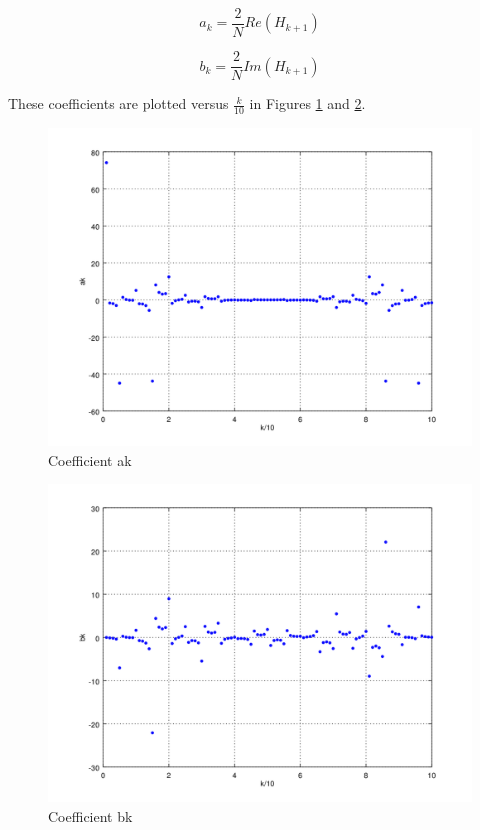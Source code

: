 \documentclass[12pt]{amsart}
\begin{document}
 \begin{equation}
 a_k = \frac{2}{N} Re(H_{k+1})
 \label{eq:ak}
 \end{equation}
 
 \begin{equation}
 b_k = \frac{2}{N} Im(H_{k+1})
 \label{eq:ak}
 \end{equation}

These coefficients are plotted versus $\frac{k}{10}$ in Figures \ref{fig:akplot} and \ref{fig:bkplot}.

\begin{center}
\begin{figure}
\includegraphics[scale=0.7]{akplot}
\caption{Coefficient ak}
\label{fig:akplot}
\end{figure}
\end{center}

\begin{center}
\begin{figure}
\includegraphics[scale=0.7]{bkplot}
\caption{Coefficient bk}
\label{fig:bkplot}
\end{figure}
\end{center}
\end{document}
